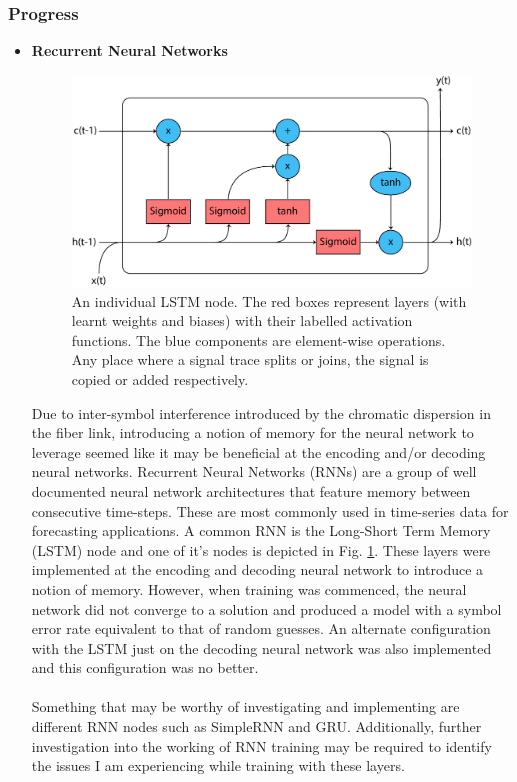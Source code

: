 \subsubsection{Progress}

\begin{itemize}
    \item \textbf{Recurrent Neural Networks}
    
        \begin{figure}[H]
            \centering
            \includegraphics[width=0.75\linewidth]{resources/lstm_node.pdf}
            \caption{An individual LSTM node. The red boxes represent layers (with learnt weights and biases) with their labelled activation functions. The blue components are element-wise operations. Any place where a signal trace splits or joins, the signal is copied or added respectively.}
            \label{fig:lstm_node}
        \end{figure}
    
        Due to inter-symbol interference introduced by the chromatic dispersion in the fiber link, introducing a notion of memory for the neural network to leverage seemed like it may be beneficial at the encoding and/or decoding neural networks. Recurrent Neural Networks (RNNs) are a group of well documented neural network architectures that feature memory between consecutive time-steps. These are most commonly used in time-series data for forecasting applications. A common RNN is the Long-Short Term Memory (LSTM) node and one of it's nodes is depicted in Fig. \ref{fig:lstm_node}. These layers were implemented at the encoding and decoding neural network to introduce a notion of memory. However, when training was commenced, the neural network did not converge to a solution and produced a model with a symbol error rate equivalent to that of random guesses. An alternate configuration with the LSTM just on the decoding neural network was also implemented and this configuration was no better. \\
        \\
        Something that may be worthy of investigating and implementing are different RNN nodes such as SimpleRNN and GRU. Additionally, further investigation into the working of RNN training may be required to identify the issues I am experiencing while training with these layers.
    

\end{itemize}
